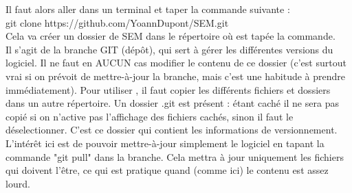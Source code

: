 \documentclass[manual-fr.tex]{subfiles}
\begin{document}
Il faut alors aller dans un terminal et taper la commande suivante :\\

git clone https://github.com/YoannDupont/SEM.git\\

Cela va créer un dossier de SEM dans le répertoire où est tapée la commande. \\

Il s'agit de la branche GIT (dépôt), qui sert à gérer les différentes
versions du logiciel. Il ne faut en AUCUN cas modifier le contenu de ce
dossier (c'est surtout vrai si on prévoit de mettre-à-jour la branche, mais
c'est une habitude à prendre immédiatement). Pour utiliser \SEM, il faut copier
les différents fichiers et dossiers dans un autre répertoire. Un dossier .git
est présent : étant caché il ne sera pas copié si on n'active pas l'affichage
des fichiers cachés, sinon il faut le déselectionner. C'est ce dossier qui
contient les informations de versionnement.\\

L'intérêt ici est de pouvoir mettre-à-jour simplement le logiciel en tapant la
commande "git pull" dans la branche. Cela mettra à jour uniquement les fichiers
qui doivent l'être, ce qui est pratique quand (comme ici) le contenu est assez
lourd.
\end{document}
